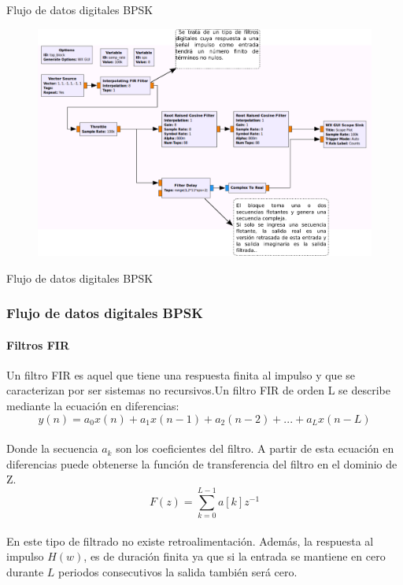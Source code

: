 \begin{frame}{Flujo de datos digitales BPSK}
\begin{figure}
\includegraphics[width=.9\textwidth]{parte1/lab5/pdf/lab5_2.pdf}
\end{figure}
\end{frame}
\begin{frame}{Flujo de datos digitales BPSK}
\frametitle{Flujo de datos digitales BPSK}
\framesubtitle{Filtros FIR}
Un filtro FIR es aquel que tiene una respuesta finita al impulso y que se caracterizan por ser sistemas no recursivos.Un filtro FIR de orden L se describe mediante la ecuación en diferencias:\\
\centering
$$y\left ( n \right )=a_{0}x\left ( n \right )+a_{1}x\left (n-1  \right )+a_{2}\left ( n-2 \right )+...+a_{L}x\left ( n-L \right )$$
\\
\justifying
Donde la secuencia $a_k$ son los coeficientes del filtro. A partir de esta
ecuación en diferencias puede obtenerse la función de transferencia del
filtro en el dominio de Z.\\
\centering
 $$F\left ( z \right )=\sum_{k=0}^{L-1}a\left [ k \right ]z^{-1}$$
\\
\justifying
En este tipo de filtrado no existe retroalimentación. Además, la respuesta
al impulso $H\left (w \right)$, es de duración finita ya que si la entrada se mantiene en cero durante $L$ periodos consecutivos la salida también será cero. 
\end{frame}

